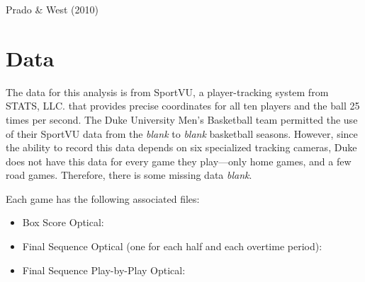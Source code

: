 \documentclass[12pt,twoside]{dukestatscithesis}
\theoremstyle{definition}
\theoremstyle{definition}
\theoremstyle{definition}
\theoremstyle{remark}
\begin{document}
Prado \& West (2010)

\chapter{Data}\label{data}

The data for this analysis is from SportVU, a player-tracking system
from STATS, LLC. that provides precise coordinates for all ten players
and the ball 25 times per second. The Duke University Men's Basketball
team permitted the use of their SportVU data from the \emph{blank} to
\emph{blank} basketball seasons. However, since the ability to record
this data depends on six specialized tracking cameras, Duke does not
have this data for every game they play---only home games, and a few
road games. Therefore, there is some missing data \emph{blank}.

Each game has the following associated files:
\begin{itemize}
\item
  Box Score Optical:
\item
  Final Sequence Optical (one for each half and each overtime period):
\item
  Final Sequence Play-by-Play Optical:
\end{itemize}
\end{document}
